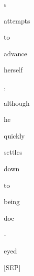 \documentclass[varwidth=150mm]{standalone}
\begin{document}
\begin{CJK*}{UTF8}{gbsn}
{{{\colorbox{red!1.2638367414474487}{\strut s} \colorbox{red!1.3048675060272217}{\strut attempts} \colorbox{red!0.0}{\strut to} \colorbox{red!0.0}{\strut advance} \colorbox{red!1.4271987676620483}{\strut herself} \colorbox{red!0.0}{\strut ,} \colorbox{red!1.255396842956543}{\strut although} \colorbox{red!1.376392126083374}{\strut he} \colorbox{red!1.4904530048370361}{\strut quickly} \colorbox{red!0.0}{\strut settles} \colorbox{red!0.0}{\strut down} \colorbox{red!1.7025147676467896}{\strut to} \colorbox{red!10.833761215209961}{\strut being} \colorbox{red!0.0}{\strut doe} \colorbox{red!4.559065341949463}{\strut -} \colorbox{red!1.494858741760254}{\strut eyed} \colorbox{red!13.790642738342285}{\strut [SEP]}
}}}
\end{CJK*}
\end{document}
